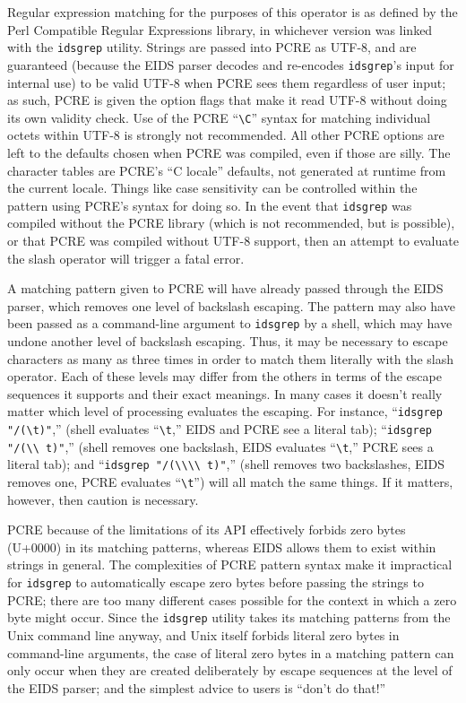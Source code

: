 \documentclass[twocolumn]{report}
\begin{document}
Regular expression matching for the purposes of this operator is as
defined by the Perl Compatible Regular Expressions library, in
whichever version was linked with the \texttt{idsgrep} utility.
Strings are passed into PCRE as UTF-8, and are guaranteed (because the
EIDS parser decodes and re-encodes \texttt{idsgrep}'s input for
internal use) to be valid UTF-8 when PCRE sees them regardless of user
input; as such, PCRE is given the option flags that make it read UTF-8
without doing its own validity check.  Use of the PCRE
``\texttt{\textbackslash C}'' syntax for matching individual octets
within UTF-8 is strongly not recommended. All other PCRE options are
left to the defaults chosen when PCRE was compiled, even if those are
silly.  The character tables are PCRE's ``C locale'' defaults, not
generated at runtime from the current locale. Things like case
sensitivity can be controlled within the pattern using PCRE's syntax
for doing so.  In the event that \texttt{idsgrep} was compiled without
the PCRE library (which is not recommended, but is possible), or that
PCRE was compiled without UTF-8 support, then an attempt to evaluate
the slash operator will trigger a fatal error.

A matching pattern given to PCRE will have already passed through the
EIDS parser, which removes one level of backslash escaping.  The
pattern may also have been passed as a command-line argument to
\texttt{idsgrep} by a shell, which may have undone another level of
backslash escaping.  Thus, it may be necessary to escape characters as
many as three times in order to match them literally with the slash
operator.  Each of these levels may differ from the others in terms of
the escape sequences it supports and their exact meanings.  In many
cases it doesn't really matter which level of processing
evaluates the escaping.  For instance, ``\texttt{idsgrep
"/(\textbackslash t)"},'' (shell
evaluates ``\texttt{\textbackslash t},'' EIDS and PCRE see a literal tab);
``\texttt{idsgrep "/(\textbackslash\textbackslash
t)"},'' (shell removes one backslash, EIDS evaluates
``\texttt{\textbackslash t},'' PCRE sees a literal tab); and ``\texttt{idsgrep
"/(\textbackslash\textbackslash\textbackslash\textbackslash
t)"},'' (shell removes two backslashes, EIDS removes
one, PCRE evaluates ``\texttt{\textbackslash t}'') will all match the same
things.  If it matters, however, then caution is necessary.

PCRE because of the limitations of its API effectively forbids zero bytes
(U+0000) in its matching patterns, whereas EIDS allows them to exist within
strings in general.  The complexities of PCRE pattern syntax make it
impractical for \texttt{idsgrep} to automatically escape zero bytes before
passing the strings to PCRE; there are too many different cases possible for
the context in which a zero byte might occur.  Since the \texttt{idsgrep}
utility takes its matching patterns from the Unix command line anyway, and
Unix itself forbids literal zero bytes in command-line arguments, the case
of literal zero bytes in a matching pattern can only occur when they are
created deliberately by escape sequences at the level of the EIDS parser;
and the simplest advice to users is ``don't do that!''
\end{document}
